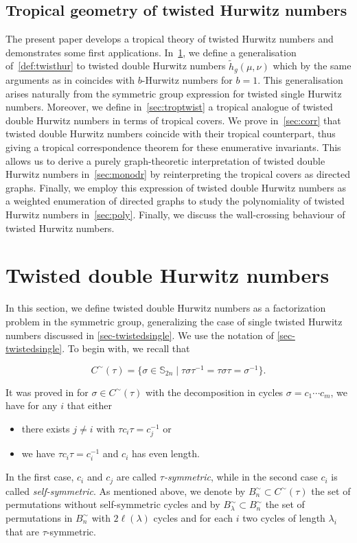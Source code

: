 \documentclass[ALCO,published]{cedram}
\begin{document}
\subsection{Tropical geometry of twisted Hurwitz numbers} 
The present paper develops a tropical theory of twisted Hurwitz numbers and demonstrates some first applications. In~\cref{sec:twistdoub}, we define a generalisation of~\cref{def:twisthur} to twisted double Hurwitz numbers $\tilde{h}_g(\mu,\nu)$ which by the same arguments as in \cite[Theorem 3.2]{BF21} coincides with $b$-Hurwitz numbers for $b=1$. This generalisation arises naturally from the symmetric group expression for twisted single Hurwitz numbers. Moreover, we define in~\cref{sec:troptwist} a tropical analogue of twisted double Hurwitz numbers in terms of tropical covers. We prove in~\cref{sec:corr} that twisted double Hurwitz numbers coincide with their tropical counterpart, thus giving a tropical correspondence theorem for these enumerative invariants. This allows us to derive a purely graph-theoretic interpretation of twisted double Hurwitz numbers in~\cref{sec:monodr} by reinterpreting the tropical covers as directed graphs.
Finally, we employ this expression of twisted double Hurwitz numbers as a weighted enumeration of directed graphs to study the polynomiality of twisted Hurwitz numbers in~\cref{sec:poly}. Finally, we discuss the wall-crossing behaviour of twisted Hurwitz numbers.

\section{Twisted double Hurwitz numbers}
\label{sec:twistdoub}
In this section, we define twisted double Hurwitz numbers as a factorization problem in the symmetric group, generalizing the case of single twisted Hurwitz numbers discussed in \cref{sec-twistedsingle}. We use the notation of \cref{sec-twistedsingle}. To begin with, we recall that

\begin{equation*}
     C^\sim(\tau)=\{\sigma\in \mathbb{S}_{2n}  \mid  \tau \sigma \tau^{-1} = \tau \sigma \tau =  \sigma^{-1}\}.
\end{equation*}

It was proved in \cite[Lemma 2.1]{BF21} for $\sigma \in C^\sim(\tau)$ with the decomposition in cycles $\sigma=c_1\cdots c_m$, we have for any $i$ that either
\begin{itemize}
    \item there exists $j\neq i$ with $\tau c_i\tau=c_j^{-1}$ or
    \item we have $\tau c_i\tau=c_i^{-1}$ and $c_i$ has even length.
\end{itemize}
In the first case, $c_i$ and $c_j$ are called \textit{$\tau$-symmetric}, while in the second case $c_i$ is called \textit{self-symmetric}. As mentioned above, we denote by $B_n^\sim\subset C^\sim(\tau)$ the set of permutations without self-symmetric cycles and by $B^\sim_\lambda\subset B^\sim_n$ the set of permutations in $B^\sim_n$ with $2\ell(\lambda)$ cycles and for each $i$ two cycles of length $\lambda_i$ that are $\tau$-symmetric.
\end{document}
